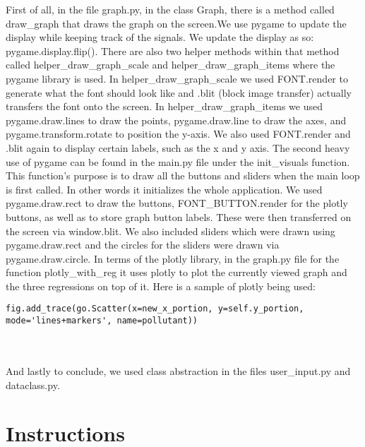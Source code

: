 \documentclass[fontsize=11pt]{article}
\begin{document}
First of all, in the file graph.py, in the class Graph, there is a method called draw\_graph that draws the graph on the screen.We use pygame to update the display while keeping track of the signals. We update the display as so: pygame.display.flip(). There are also two helper methods within that method called helper\_draw\_graph\_scale and helper\_draw\_graph\_items where the pygame library is used. In helper\_draw\_graph\_scale we used FONT.render to generate what the font should look like and .blit (block image transfer) actually transfers the font onto the screen. In helper\_draw\_graph\_items we used pygame.draw.lines to draw the points, pygame.draw.line to draw the axes, and pygame.transform.rotate to position the y-axis. We also used FONT.render and .blit again to display certain labels, such as the x and y axis. The second heavy use of pygame can be found in the main.py file under the init\_visuals function. This function's purpose is to draw all the buttons and sliders when the main loop is first called. In other words it initializes the whole application. We used pygame.draw.rect to draw the buttons, FONT\_BUTTON.render for the plotly buttons, as well as to store graph button labels. These were then transferred on the screen via window.blit. We also included sliders which were drawn using pygame.draw.rect and the circles for the sliders were drawn via pygame.draw.circle. In terms of the plotly library, in the graph.py file for the function plotly\_with\_reg it uses plotly to plot the currently viewed graph and the three regressions on top of it. Here is a sample of plotly being used:

\begin{verbatim}
fig.add_trace(go.Scatter(x=new_x_portion, y=self.y_portion,
mode='lines+markers', name=pollutant))
\end{verbatim}\\

\\And lastly to conclude,  we used class abstraction in the files user\_input.py and dataclass.py. 

\section*{Instructions}
\end{document}
